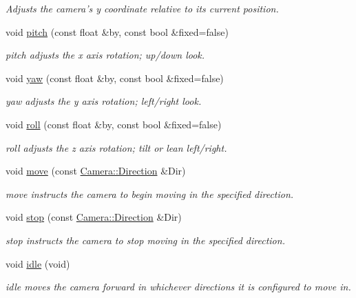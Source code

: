 \begin{DoxyCompactItemize}
\begin{DoxyCompactList}\small\item\em Adjusts the camera's y coordinate relative to its current position. \end{DoxyCompactList}\item 
void \hyperlink{class_camera_aac7dbb6201be7f17e014fc6fdf915560}{pitch} (const float \&by, const bool \&fixed=false)
\begin{DoxyCompactList}\small\item\em pitch adjusts the x axis rotation; up/down look. \end{DoxyCompactList}\item 
void \hyperlink{class_camera_a0ce7d12edbe47d9a8915d8af98d8f524}{yaw} (const float \&by, const bool \&fixed=false)
\begin{DoxyCompactList}\small\item\em yaw adjusts the y axis rotation; left/right look. \end{DoxyCompactList}\item 
void \hyperlink{class_camera_a1ba0979fe0b2ec58085d5f9721858e5e}{roll} (const float \&by, const bool \&fixed=false)
\begin{DoxyCompactList}\small\item\em roll adjusts the z axis rotation; tilt or lean left/right. \end{DoxyCompactList}\item 
void \hyperlink{class_camera_aaa9706527438bd5bd323dd018bb34fcf}{move} (const \hyperlink{class_camera_a80cb65605322d27ad3b6d973484509ec}{Camera\-::\-Direction} \&Dir)
\begin{DoxyCompactList}\small\item\em move instructs the camera to begin moving in the specified direction. \end{DoxyCompactList}\item 
void \hyperlink{class_camera_ae7414c6ae83c3c9392ab90e957daf2b9}{stop} (const \hyperlink{class_camera_a80cb65605322d27ad3b6d973484509ec}{Camera\-::\-Direction} \&Dir)
\begin{DoxyCompactList}\small\item\em stop instructs the camera to stop moving in the specified direction. \end{DoxyCompactList}\item 
void \hyperlink{class_camera_a9c620bd05c119791c080e479ee71abc2}{idle} (void)
\begin{DoxyCompactList}\small\item\em idle moves the camera forward in whichever directions it is configured to move in. \end{DoxyCompactList}\item 

\end{DoxyCompactItemize}
